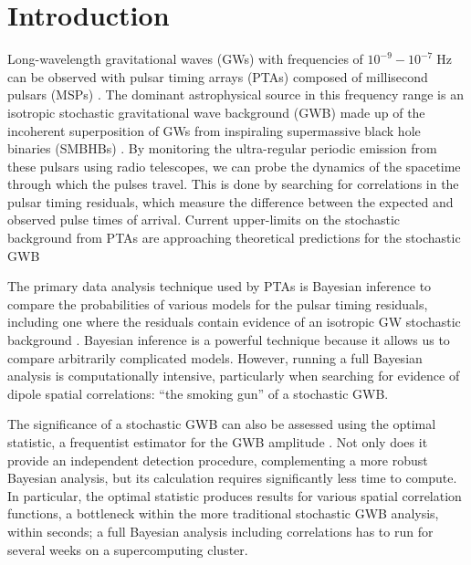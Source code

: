 \documentclass[twocolumn,aps,prd,superscriptaddress]{revtex4-1}
\begin{document}
\section{Introduction}

Long-wavelength gravitational waves (GWs) with frequencies of 
$10^{-9} - 10^{-7} \; \mathrm{Hz}$ can be observed with pulsar timing arrays (PTAs) 
composed of millisecond pulsars (MSPs) \cite{hd1983,fb1990}. 
The dominant astrophysical source in this frequency range is an isotropic stochastic 
gravitational wave background (GWB) 
made up of the incoherent superposition of GWs from inspiraling 
supermassive black hole binaries (SMBHBs) 
\citep{1995ApJ...446..543R, 2003ApJ...583..616J, 2003ApJ...590..691W}. 
By monitoring the ultra-regular periodic emission from these pulsars using radio telescopes, 
we can probe the dynamics of the spacetime through which the pulses travel. 
This is done by searching for correlations in the pulsar timing residuals, 
which measure the difference between the expected and observed pulse times of arrival. 
Current upper-limits on the stochastic background from PTAs are approaching 
theoretical predictions for the stochastic GWB \citep{PPTA2013,EPTA2015,abb+17b}

The primary data analysis technique used by PTAs is Bayesian inference 
to compare the probabilities of various models for the pulsar timing residuals, 
including one where the residuals contain evidence of an isotropic GW stochastic background 
\citep{vlm+2009,lah+2013}. 
Bayesian inference is a powerful technique because it allows us to compare arbitrarily complicated models. 
However, running a full Bayesian analysis is computationally intensive, 
particularly when searching for evidence of dipole spatial correlations:
``the smoking gun'' of a stochastic GWB.

The significance of a stochastic GWB can also be assessed using the 
optimal statistic, a frequentist estimator for the GWB amplitude \citep{abc+2009,demorest+2013,ccs+2015}. 
Not only does it provide an independent detection procedure, complementing a more robust Bayesian analysis, but its calculation requires significantly less time to compute. In particular, the optimal statistic produces results for various spatial correlation functions, a bottleneck within the more traditional stochastic GWB analysis, within seconds; a full Bayesian analysis including correlations has to run for several weeks on a supercomputing cluster. 
\end{document}
